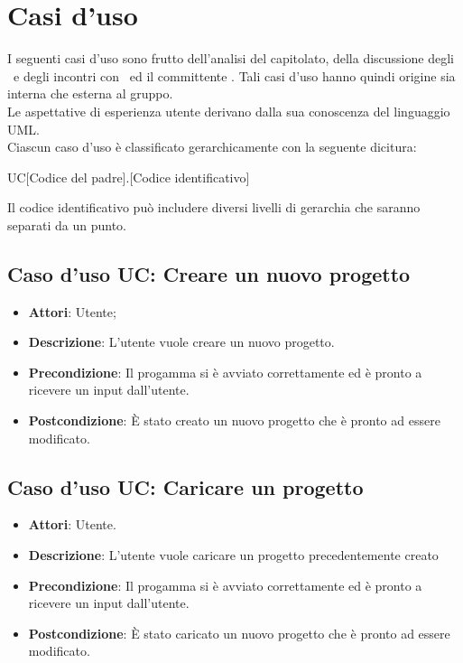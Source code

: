 \documentclass[../AnalisiDeiRequisiti.tex]{subfiles}
\begin{document}
	\section{Casi d'uso }
	I seguenti casi d'uso sono frutto dell'analisi del capitolato, della discussione degli
	\analisti\ e degli incontri con	\proponente\ ed il committente \vardanega.
	Tali casi d'uso hanno quindi origine sia interna che esterna al gruppo.\\
	Le aspettative di esperienza utente derivano dalla sua conoscenza del
	linguaggio UML.\\
	Ciascun caso d'uso è classificato gerarchicamente con la seguente dicitura:
	\begin{center}
		UC[Codice del padre].[Codice identificativo]
	\end{center}
	Il codice identificativo può includere diversi livelli di gerarchia che saranno
	separati da un punto.
	
	\subsection{Caso d'uso UC: Creare un nuovo progetto}
	\begin{itemize}
		\item \textbf{Attori}: Utente;
		\item \textbf{Descrizione}: L'utente vuole creare un nuovo progetto.
		\item \textbf{Precondizione}: Il progamma si è avviato correttamente ed è pronto a ricevere un input dall'utente. 
		\item \textbf{Postcondizione}: È stato creato un nuovo progetto che è pronto ad essere modificato.
	\end{itemize}
	
	\subsection{Caso d'uso UC: Caricare un progetto}
	\begin{itemize}
		\item \textbf{Attori}: Utente. 
		\item \textbf{Descrizione}: L'utente vuole caricare un progetto precedentemente creato
		\item \textbf{Precondizione}: Il progamma si è avviato correttamente ed è pronto a ricevere un input dall'utente.
		\item \textbf{Postcondizione}: È stato caricato un nuovo progetto che è pronto ad essere modificato.
	\end{itemize}
		
\end{document}
